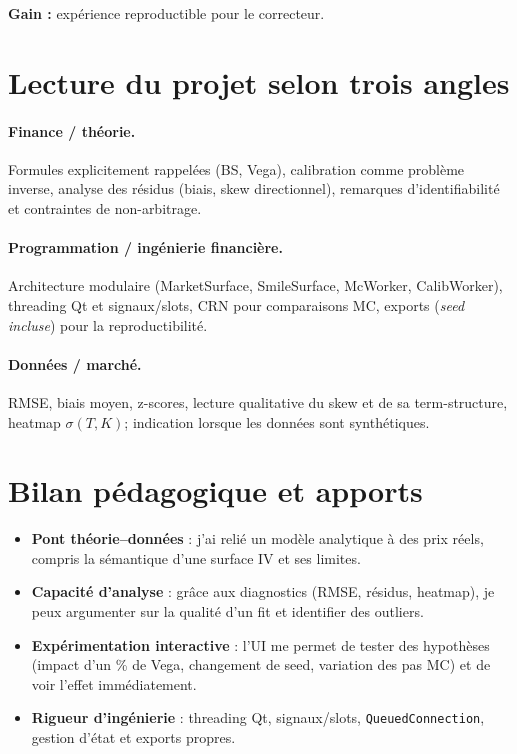 \documentclass[11pt,a4paper]{article}
\begin{document}
\textbf{Gain :} expérience reproductible pour le correcteur.

\section{Lecture du projet selon trois angles}
\paragraph{Finance / théorie.}
Formules explicitement rappelées (BS, Vega), calibration comme problème inverse, analyse des résidus
(biais, skew directionnel), remarques d'identifiabilité et contraintes de non-arbitrage.

\paragraph{Programmation / ingénierie financière.}
Architecture modulaire (MarketSurface, SmileSurface, McWorker, CalibWorker), 
threading Qt et signaux/slots, CRN pour comparaisons MC, exports (\emph{seed incluse}) pour la reproductibilité.

\paragraph{Données / marché.}
RMSE, biais moyen, z-scores, lecture qualitative du skew et de sa term-structure, heatmap 
$\sigma(T,K)$; indication lorsque les données sont synthétiques.


\section{Bilan pédagogique et apports}

\begin{itemize}[leftmargin=*]
  \item \textbf{Pont théorie–données} : j’ai relié un modèle analytique à des prix réels, compris la sémantique d’une surface IV et ses limites.
  \item \textbf{Capacité d’analyse} : grâce aux diagnostics (RMSE, résidus, heatmap), je peux argumenter sur la qualité d’un fit et identifier des outliers.
  \item \textbf{Expérimentation interactive} : l’UI me permet de tester des hypothèses (impact d’un \% de Vega, changement de seed, variation des pas MC) et de voir l’effet immédiatement.
  \item \textbf{Rigueur d’ingénierie} : threading Qt, signaux/slots, \texttt{QueuedConnection}, gestion d’état et exports propres.
\end{itemize}
\end{document}
